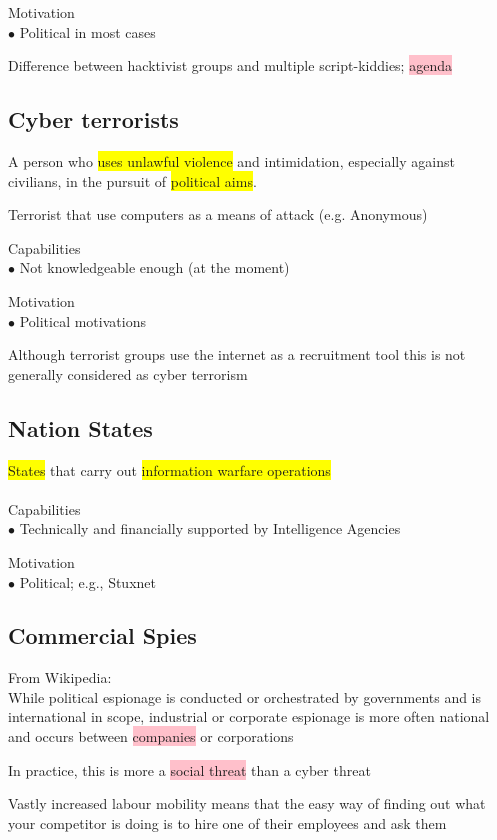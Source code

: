 \documentclass[tikz,border=10pt]{project_plan}
\newcommand{\bulletPoint}{\hspace{-3.1pt}$\bullet$ \hspace{5pt}}
\begin{document}
Motivation\\
\bulletPoint Political in most cases

Difference between hacktivist groups and multiple script-kiddies; \colorbox{pink}{agenda}

\subsection{Cyber terrorists}
A person who \colorbox{yellow}{uses unlawful violence} and intimidation, especially against civilians,
in the pursuit of \colorbox{yellow}{political aims}.

Terrorist that use computers as a means of attack (e.g. Anonymous)

Capabilities\\
\bulletPoint Not knowledgeable enough (at the moment)

Motivation\\
\bulletPoint Political motivations

Although terrorist groups use the internet as a recruitment tool this is not generally
considered as cyber terrorism

\subsection{Nation States}
\colorbox{yellow}{States} that carry out \colorbox{yellow}{information warfare operations}\\\\
Capabilities\\
\bulletPoint Technically and financially supported by Intelligence Agencies

Motivation\\
\bulletPoint Political; e.g., Stuxnet

\subsection{Commercial Spies}
From Wikipedia:\\
While political espionage is conducted or orchestrated by governments and is
international in scope, industrial or corporate espionage is more often national
and occurs between \colorbox{pink}{companies} or corporations

In practice, this is more a \colorbox{pink}{social threat} than a cyber threat

Vastly increased labour mobility means that the easy way of finding out what your competitor is doing is to hire one of
their employees and ask them
\end{document}
